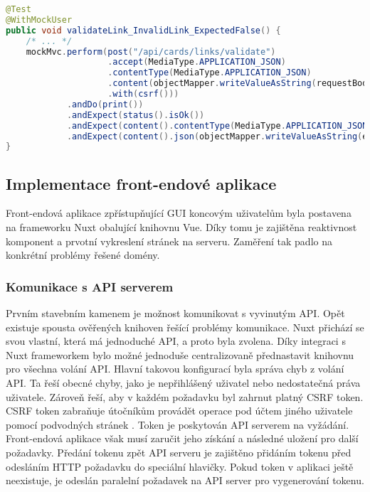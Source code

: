 		\begin{lstlisting}[language=Java, caption={Ukázka testu volání API validující odkaz. Zdroj: [autor]}]
@Test
@WithMockUser
public void validateLink_InvalidLink_ExpectedFalse() {
	/* ... */
	mockMvc.perform(post("/api/cards/links/validate")
					.accept(MediaType.APPLICATION_JSON)
					.contentType(MediaType.APPLICATION_JSON)
					.content(objectMapper.writeValueAsString(requestBody))
					.with(csrf()))
			.andDo(print())
			.andExpect(status().isOk())
			.andExpect(content().contentType(MediaType.APPLICATION_JSON))
			.andExpect(content().json(objectMapper.writeValueAsString(expectedResponseBody)));
}
		\end{lstlisting}

	\subsection{Implementace front-endové aplikace}

	Front-endová aplikace zpřístupňující \ac{GUI} koncovým uživatelům byla postavena na frameworku
	Nuxt obalující knihovnu Vue.
	Díky tomu je zajištěna reaktivnost komponent a prvotní vykreslení stránek na serveru.
	Zaměření tak padlo na konkrétní problémy řešené domény.

		\subsubsection{Komunikace s API serverem}

		Prvním stavebním kamenem je možnost komunikovat s vyvinutým \ac{API}.
		Opět existuje spousta ověřených knihoven řešící problémy komunikace.
		Nuxt přichází se svou vlastní, která má jednoduché \ac{API}, a proto byla zvolena.
		Díky integraci s Nuxt frameworkem bylo možné jednoduše centralizovaně přednastavit knihovnu pro všechna volání \ac{API}.
		Hlavní takovou konfigurací byla správa chyb z volání \ac{API}.
		Ta řeší obecné chyby, jako je nepřihlášený uživatel nebo nedostatečná práva uživatele.
		Zároveň řeší, aby v každém požadavku byl zahrnut platný \ac{CSRF} token.
		\ac{CSRF} token zabraňuje útočníkům provádět operace pod účtem jiného uživatele pomocí podvodných stránek \cite{csrf}.
		Token je poskytován \ac{API} serverem na vyžádání.
		Front-endová aplikace však musí zaručit jeho získání a následné uložení pro další požadavky.
		Předání tokenu zpět \ac{API} serveru je zajištěno přidáním tokenu před odesláním \ac{HTTP} požadavku do speciální hlavičky.
		Pokud token v aplikaci ještě neexistuje, je odeslán paralelní požadavek na \ac{API} server pro vygenerování tokenu.

